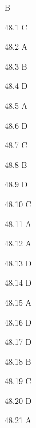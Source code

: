 \begin{Solution}{48}
B
\end{Solution}
\begin{Solution}{48.{1}}
C
\end{Solution}
\begin{Solution}{48.{2}}
A
\end{Solution}
\begin{Solution}{48.{3}}
B
\end{Solution}
\begin{Solution}{48.{4}}
D
\end{Solution}
\begin{Solution}{48.{5}}
A
\end{Solution}
\begin{Solution}{48.{6}}
D
\end{Solution}
\begin{Solution}{48.{7}}
C
\end{Solution}
\begin{Solution}{48.{8}}
B
\end{Solution}
\begin{Solution}{48.{9}}
D
\end{Solution}
\begin{Solution}{48.{10}}
C
\end{Solution}
\begin{Solution}{48.{11}}
A
\end{Solution}
\begin{Solution}{48.{12}}
A
\end{Solution}
\begin{Solution}{48.{13}}
D
\end{Solution}
\begin{Solution}{48.{14}}
D
\end{Solution}
\begin{Solution}{48.{15}}
A
\end{Solution}
\begin{Solution}{48.{16}}
D
\end{Solution}
\begin{Solution}{48.{17}}
D
\end{Solution}
\begin{Solution}{48.{18}}
B
\end{Solution}
\begin{Solution}{48.{19}}
C
\end{Solution}
\begin{Solution}{48.{20}}
D
\end{Solution}
\begin{Solution}{48.{21}}
A
\end{Solution}

